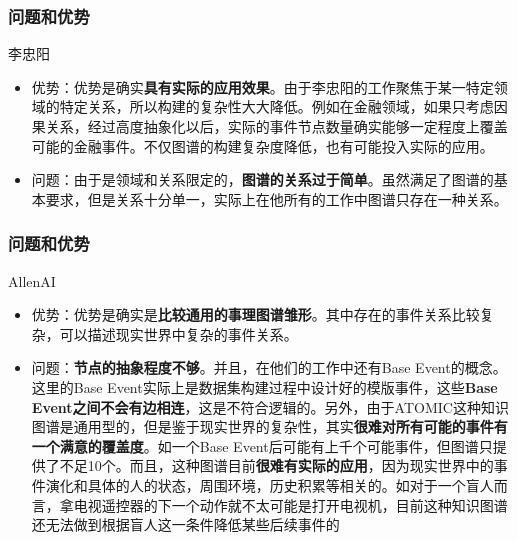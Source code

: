 \documentclass[10pt,aspectratio=43,mathserif]{beamer}
\begin{document}
        \begin{frame}
            \frametitle{\textbf{问题和优势}}
            \begin{block}{李忠阳}
                \begin{itemize}
                    \item 优势：优势是确实\textbf{具有实际的应用效果}。由于李忠阳的工作聚焦于某一特定领域的特定关系，所以构建的复杂性大大降低。例如在金融领域，如果只考虑因果关系，经过高度抽象化以后，实际的事件节点数量确实能够一定程度上覆盖可能的金融事件。不仅图谱的构建复杂度降低，也有可能投入实际的应用。
                    \item 问题：由于是领域和关系限定的，\textbf{图谱的关系过于简单}。虽然满足了图谱的基本要求，但是关系十分单一，实际上在他所有的工作中图谱只存在一种关系。
                \end{itemize}
            \end{block}
        \end{frame}
        \begin{frame}
            \frametitle{\textbf{问题和优势}}
            \begin{block}{AllenAI}
                \begin{itemize}
                    \item \small {优势：优势是确实是\textbf{比较通用的事理图谱雏形}。其中存在的事件关系比较复杂，可以描述现实世界中复杂的事件关系。}
                    \item \small {问题：\textbf{节点的抽象程度不够}。并且，在他们的工作中还有Base Event的概念。这里的Base Event实际上是数据集构建过程中设计好的模版事件，这些\textbf{Base Event之间不会有边相连}，这是不符合逻辑的。另外，由于ATOMIC这种知识图谱是通用型的，但是鉴于现实世界的复杂性，其实\textbf{很难对所有可能的事件有一个满意的覆盖度}。如一个Base Event后可能有上千个可能事件，但图谱只提供了不足10个。而且，这种图谱目前\textbf{很难有实际的应用}，因为现实世界中的事件演化和具体的人的状态，周围环境，历史积累等相关的。如对于一个盲人而言，拿电视遥控器的下一个动作就不太可能是打开电视机，目前这种知识图谱还无法做到根据盲人这一条件降低某些后续事件的}
                \end{itemize}
            \end{block}
        \end{frame}        
\end{document}

